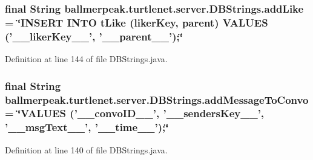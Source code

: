 \hypertarget{classballmerpeak_1_1turtlenet_1_1server_1_1DBStrings_a2a78b8bf2571d76c753619719f6f5aac}{
\subsubsection[{add\-Like}]{\setlength{\rightskip}{0pt plus 5cm}final String ballmerpeak.\-turtlenet.\-server.\-D\-B\-Strings.\-add\-Like = \char`\"{}I\-N\-S\-E\-R\-T I\-N\-T\-O t\-Like (liker\-Key, parent) V\-A\-L\-U\-E\-S ('\-\_\-\-\_\-liker\-Key\-\_\-\-\_\-', '\-\_\-\-\_\-parent\-\_\-\-\_\-');\char`\"{}\hspace{0.3cm}{\ttfamily [static]}}}\label{classballmerpeak_1_1turtlenet_1_1server_1_1DBStrings_a2a78b8bf2571d76c753619719f6f5aac}


Definition at line 144 of file D\-B\-Strings.\-java.

\hypertarget{classballmerpeak_1_1turtlenet_1_1server_1_1DBStrings_a45dac2349c3f3f754513df6f87cc3b50}{
\subsubsection[{add\-Message\-To\-Convo}]{\setlength{\rightskip}{0pt plus 5cm}final String ballmerpeak.\-turtlenet.\-server.\-D\-B\-Strings.\-add\-Message\-To\-Convo = \char`\"{}V\-A\-L\-U\-E\-S ('\-\_\-\-\_\-convo\-I\-D\-\_\-\-\_\-', '\-\_\-\-\_\-senders\-Key\-\_\-\-\_\-', '\-\_\-\-\_\-msg\-Text\-\_\-\-\_\-', '\-\_\-\-\_\-time\-\_\-\-\_\-');\char`\"{}\hspace{0.3cm}{\ttfamily [static]}}}\label{classballmerpeak_1_1turtlenet_1_1server_1_1DBStrings_a45dac2349c3f3f754513df6f87cc3b50}


Definition at line 140 of file D\-B\-Strings.\-java.

